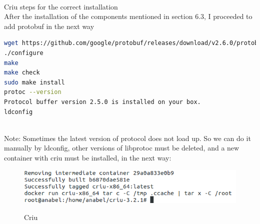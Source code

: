 \\
Criu steps for the correct installation\\

After the installation of the components mentioned in section 6.3, I proceeded to add protobuf in the next way

\begin{lstlisting}[language=bash,frame=tb,caption={Protoc}] 
wget https://github.com/google/protobuf/releases/download/v2.6.0/protobuf-2.6.0.tar.bz2
./configure
make
make check
sudo make install
protoc --version
Protocol buffer version 2.5.0 is installed on your box.
ldconfig
\end{lstlisting}\\

Note: Sometimes the latest version of protocol does not load up. So we can do it manually by ldconfig, other versions of libprotoc must be deleted, and a new container with criu must be installed, in the next way:

\begin{figure}[bth]
{\includegraphics[width=1\linewidth]{gfx/criu}}\caption[Criu]{Criu}
\label{fig:criu}
\end{figure}\\